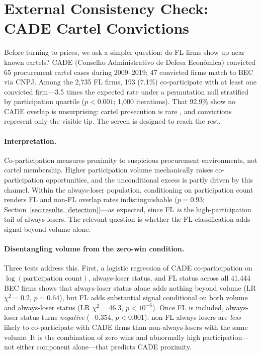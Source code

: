 \section{External Consistency Check: CADE Cartel Convictions}
\label{sec:cade}

Before turning to prices, we ask a simpler question: do FL firms
show up near known cartels? CADE (Conselho Administrativo de Defesa
Econ\^omica) convicted 65 procurement cartel cases during 2009--2019;
47 convicted firms match to BEC via CNPJ. Among the 2,735 FL firms,
193 (7.1\%) co-participate with at least one convicted
firm---3.5 times the expected rate under a permutation null
stratified by participation quartile ($p < 0.001$; 1,000
iterations). That 92.9\% show no CADE overlap is unsurprising:
cartel prosecution is rare \citep{connor2007price}, and convictions
represent only the visible tip. The screen is designed to reach the
rest.

\paragraph{Interpretation.}
Co-participation measures proximity to suspicious procurement
environments, not cartel membership. Higher participation volume
mechanically raises co-participation opportunities, and the
unconditional excess is partly driven by this channel. Within the
always-loser population, conditioning on participation count renders
FL and non-FL overlap rates indistinguishable ($p = 0.93$;
Section~\ref{sec:results_detection})---as expected, since FL \emph{is}
the high-participation tail of always-losers. The relevant question
is whether the FL classification adds signal beyond volume alone.

\paragraph{Disentangling volume from the zero-win condition.}
Three tests address this. First, a logistic regression of CADE
co-participation on $\log(\text{participation count})$,
always-loser status, and FL status across all 41,444 BEC firms
shows that always-loser status alone adds nothing beyond volume
(LR $\chi^2 = 0.2$, $p = 0.64$), but FL adds substantial signal
conditional on both volume and always-loser status
(LR $\chi^2 = 46.3$, $p < 10^{-6}$). Once FL is included,
always-loser status turns \emph{negative} ($-0.354$,
$p < 0.001$): non-FL always-losers are \emph{less} likely to
co-participate with CADE firms than non-always-losers with the
same volume. It is the combination of zero wins and abnormally
high participation---not either component alone---that predicts
CADE proximity.

